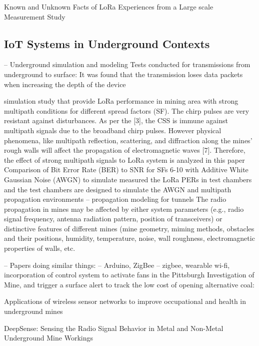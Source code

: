 \documentclass[a4paper,twoside,12pt]{report}
\begin{document}
Known and Unknown Facts of LoRa Experiences from a Large scale Measurement Study \cite{Liando2019KnownStudy}

\subsection{IoT Systems in Underground Contexts}

-- Underground simulation and modeling
Tests conducted for transmissions from underground to surface: \citep{Villarim2022EvaluationApplications}
It was found that the transmission loses data packets when increasing the depth of the device

simulation study that provide LoRa performance in mining area with strong multipath conditions for different spread factors (SF). \citep{Emmanuel2019LoRaMines}
The chirp pulses are very resistant against disturbances. As per the [3], the CSS is immune against multipath signals due to the broadband chirp pulses. However physical phenomena, like multipath reflection, scattering, and diffraction along the mines’ rough walls will affect the propagation of electromagnetic waves [7]. Therefore, the effect of strong multipath signals to LoRa system is analyzed in this paper
Comparison of Bit Error Rate (BER) to SNR for SFs 6-10 with Additive White Gaussian Noise (AWGN) to simulate 
\citep{MineRadioPredictionModel3} measured the LoRa PERs in test chambers and the test chambers are designed to simulate the AWGN and multipath propagation environments
\citep{Hrovat2014ATunnels} -- propagation modeling for tunnels
The radio propagation in mines may be affected by either system parameters (e.g., radio signal frequency, antenna radiation pattern, position of transceivers) or distinctive features of different mines (mine geometry, miming methods, obstacles and their positions, humidity, temperature, noise, wall roughness, electromagnetic properties of walls, etc.

-- Papers doing similar things:
 \cite{Jo_Khan_2018} -- Arduino, ZigBee
 \cite{Zhu2019MonitoringNetwork} -- zigbee, wearable
 wi-fi, incorporation of control system to activate fans in the Pittsburgh Investigation of Mine, and trigger a surface alert to track the low cost of opening alternative coal: \cite{Ali2022ImprovingSystem} 

Applications of wireless sensor networks to improve occupational and health in underground mines \cite{Sadeghi2022ApplicationsMines}

DeepSense: Sensing the Radio Signal Behavior in Metal and Non-Metal Underground Mine Workings \cite{Ranjan2018DeepSense:Workings}
\end{document}
